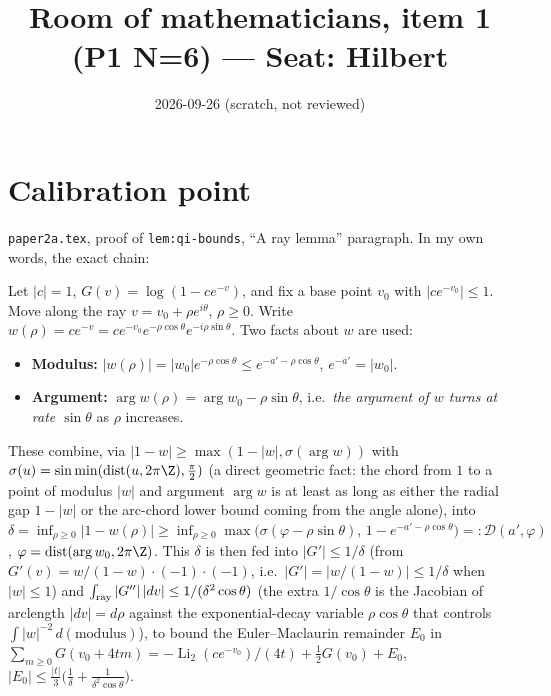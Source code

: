 \documentclass[11pt]{article}
\title{Room of mathematicians, item 1 (P1 N=6) --- Seat: Hilbert}
\author{}
\date{2026-09-26 (scratch, not reviewed)}
\begin{document}
\maketitle

\section{Calibration point}

\texttt{paper2a.tex}, proof of \texttt{lem:qi-bounds}, ``A ray lemma'' paragraph. In my own words, the
exact chain:

Let $|c|=1$, $G(v)=\log(1-ce^{-v})$, and fix a base point $v_0$ with $|ce^{-v_0}|\le1$. Move along the ray
$v=v_0+\rho e^{i\theta}$, $\rho\ge0$. Write $w(\rho)=ce^{-v}=ce^{-v_0}e^{-\rho\cos\theta}e^{-i\rho\sin\theta}$.
Two facts about $w$ are used:
\begin{itemize}
\item \textbf{Modulus:} $|w(\rho)|=|w_0|e^{-\rho\cos\theta}\le e^{-a'-\rho\cos\theta}$, $e^{-a'}=|w_0|$.
\item \textbf{Argument:} $\arg w(\rho)=\arg w_0-\rho\sin\theta$, i.e.\ \emph{the argument of $w$ turns at
rate $\sin\theta$} as $\rho$ increases.
\end{itemize}
These combine, via $|1-w|\ge\max(1-|w|,\sigma(\arg w))$ with $\sigma(u)=\sin\min(\operatorname{dist}(u,2\pi\Z),\frac\pi2)$
(a direct geometric fact: the chord from $1$ to a point of modulus $|w|$ and argument $\arg w$ is at least
as long as either the radial gap $1-|w|$ or the arc-chord lower bound coming from the angle alone), into
$\delta=\inf_{\rho\ge0}|1-w(\rho)|\ge\inf_{\rho\ge0}\max\bigl(\sigma(\varphi-\rho\sin\theta),\,1-e^{-a'-\rho\cos\theta}\bigr)=:\mathcal D(a',\varphi)$,
$\varphi=\operatorname{dist}(\arg w_0,2\pi\Z)$. This $\delta$ is then fed into $|G'|\le1/\delta$ (from
$G'(v)=w/(1-w)\cdot(-1)\cdot(-1)$, i.e.\ $|G'|=|w/(1-w)|\le1/\delta$ when $|w|\le1$) and
$\int_{\rm ray}|G''|\,|dv|\le1/(\delta^2\cos\theta)$ (the extra $1/\cos\theta$ is the Jacobian of arclength
$|dv|=d\rho$ against the exponential-decay variable $\rho\cos\theta$ that controls $\int|w|^{-2}\,d(\text{modulus})$),
to bound the Euler--Maclaurin remainder $E_0$ in $\sum_{m\ge0}G(v_0+4tm)=-\operatorname{Li}_2(ce^{-v_0})/(4t)+\tfrac12G(v_0)+E_0$,
$|E_0|\le\frac{|t|}3\bigl(\frac1\delta+\frac1{\delta^2\cos\theta}\bigr)$.
\end{document}
